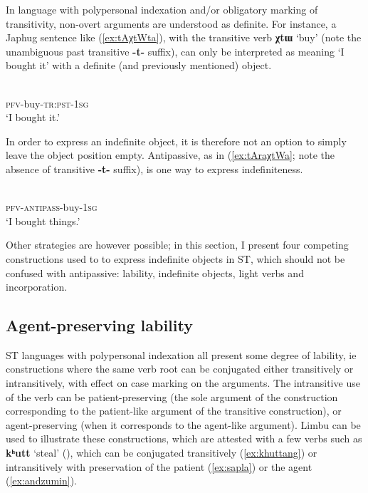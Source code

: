 \documentclass[oneside,a4paper,11pt]{article}
\newcommand{\ipa}[1]{{\phon\textbf{#1}}}
\begin{document}
In language with polypersonal indexation and/or obligatory marking of transitivity, non-overt arguments are understood as definite. For instance, a Japhug sentence like (\ref{ex:tAχtWta}), with the transitive verb \ipa{χtɯ} `buy' (note the unambiguous past transitive \ipa{-t-} suffix), can only be interpreted as meaning `I bought it' with a definite (and previously mentioned) object.

\begin{exe}
\ex \label{ex:tAχtWta}
\gll \ipa{tɤ-χtɯ-t-a} \\
\textsc{pfv}-buy-\textsc{tr:pst-1sg} \\
\glt `I bought it.'
\end{exe}

In order to express an indefinite object, it is therefore not an option to simply leave the object position empty. Antipassive, as in (\ref{ex:tAraχtWa}; note the absence of transitive \ipa{-t-} suffix), is one way to express indefiniteness. 

\begin{exe}
\ex \label{ex:tAraχtWa}
\gll \ipa{tɤ-ra-χtɯ-a} \\
\textsc{pfv}-\textsc{antipass}-buy-\textsc{1sg} \\
\glt `I bought things.'
\end{exe}

Other strategies are however possible; in this section, I present four competing constructions used to to express indefinite objects in ST, which should not be confused with antipassive: lability, indefinite objects, light verbs and incorporation.  

\subsection{Agent-preserving lability} \label{sec:labile}
ST languages with polypersonal indexation all present some degree of lability, ie constructions where the same verb root can be conjugated either transitively or intransitively, with effect on case marking on the arguments. The intransitive use of the verb can be patient-preserving (the sole argument of the construction corresponding to the patient-like argument of the transitive construction), or agent-preserving (when it corresponds to the agent-like argument).  Limbu can be used to illustrate these constructions, which are attested with a few verbs such as  \ipa{kʰutt} `steal' (\citealt[527]{driem91tangut}), which can be conjugated transitively (\ref{ex:khuttang}) or intransitively with preservation of the patient (\ref{ex:sapla}) or the agent (\ref{ex:andzumin}).
\end{document}

